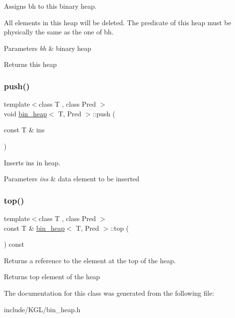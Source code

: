 Assigns {\ttfamily bh} to this binary heap. 

All elements in this heap will be deleted. The predicate of this heap must be physically the same as the one of {\ttfamily bh}.


\begin{DoxyParams}{Parameters}
{\em bh} & binary heap\\
\hline
\end{DoxyParams}
\begin{DoxyReturn}{Returns}
this heap 
\end{DoxyReturn}
\mbox{\label{classbin__heap_a6d658d61533e66cf83dce2f8e35bed17}} 
\subsubsection{\texorpdfstring{push()}{push()}}
{\footnotesize\ttfamily template$<$class T , class Pred $>$ \\
void \mbox{\hyperlink{classbin__heap}{bin\+\_\+heap}}$<$ T, Pred $>$\+::push (\begin{DoxyParamCaption}\item[{const T \&}]{ins }\end{DoxyParamCaption})}



Inserts {\ttfamily ins} in heap. 


\begin{DoxyParams}{Parameters}
{\em ins} & data element to be inserted \\
\hline
\end{DoxyParams}
\mbox{\label{classbin__heap_acd711ddeafe82630f153906da7e8fa1c}} 
\subsubsection{\texorpdfstring{top()}{top()}}
{\footnotesize\ttfamily template$<$class T , class Pred $>$ \\
const T \& \mbox{\hyperlink{classbin__heap}{bin\+\_\+heap}}$<$ T, Pred $>$\+::top (\begin{DoxyParamCaption}{ }\end{DoxyParamCaption}) const}



Returns a reference to the element at the top of the heap. 

\begin{DoxyReturn}{Returns}
top element of the heap 
\end{DoxyReturn}


The documentation for this class was generated from the following file\+:\begin{DoxyCompactItemize}
\item 
include/\+K\+G\+L/bin\+\_\+heap.\+h\end{DoxyCompactItemize}
